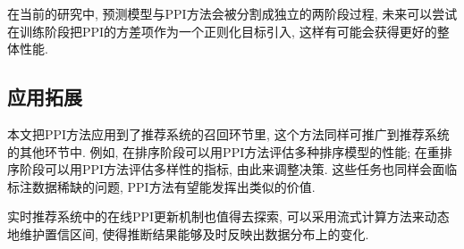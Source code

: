 \documentclass[a4paper, AutoFakeBold, UTF8]{ctexrep}
\theoremstyle{plain}
\numberwithin{equation}{chapter}
\begin{document}
在当前的研究中, 预测模型与PPI方法会被分割成独立的两阶段过程, 未来可以尝试在训练阶段把PPI的方差项作为一个正则化目标引入, 这样有可能会获得更好的整体性能. 

\subsection{应用拓展}

本文把PPI方法应用到了推荐系统的召回环节里, 这个方法同样可推广到推荐系统的其他环节中. 例如, 在排序阶段可以用PPI方法评估多种排序模型的性能; 在重排序阶段可以用PPI方法评估多样性的指标, 由此来调整决策. 这些任务也同样会面临标注数据稀缺的问题, PPI方法有望能发挥出类似的价值. 

实时推荐系统中的在线PPI更新机制也值得去探索, 可以采用流式计算方法来动态地维护置信区间, 使得推断结果能够及时反映出数据分布上的变化. 
\end{document}
